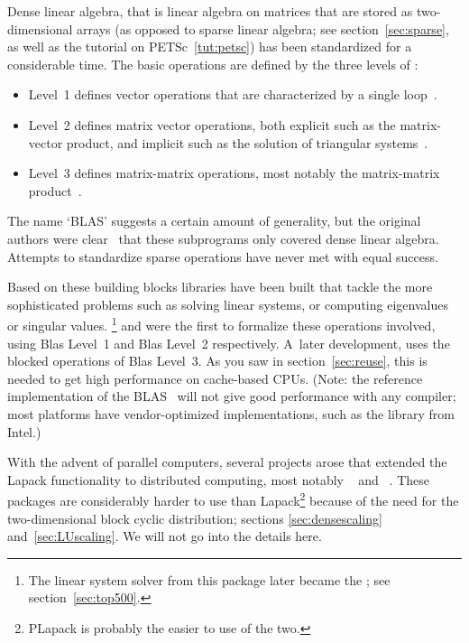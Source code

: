 Dense linear algebra, that is linear algebra on matrices that are
stored as two-dimensional arrays (as opposed to sparse linear algebra;
see section~\ref{sec:sparse}, as well as the
tutorial on PETSc~\ref{tut:petsc}) has been standardized for a
considerable time. The basic operations are defined by the three
levels of :
\begin{itemize}
\item Level~1 defines vector operations that are characterized by a
  single loop~\cite{Lawson:blas}.
\item Level~2 defines matrix vector operations, both explicit such as
  the matrix-vector product, and implicit such as the solution of
  triangular systems~\cite{BLAS2}.
\item Level~3 defines matrix-matrix operations, most notably the
  matrix-matrix product~\cite{BLAS3}.
\end{itemize}
The name `BLAS' suggests a certain amount of generality, but the
original authors were clear~\cite{Lawson:blas} that these subprograms
only covered dense linear algebra. Attempts to standardize sparse
operations have never met with equal success.

Based on these building blocks libraries have been built that tackle
the more sophisticated problems such as solving linear systems, or
computing eigenvalues or singular values.
\footnote{The linear system solver from this
  package later became the ; see
  section~\ref{sec:top500}.} and  were the first to formalize
these operations involved, using Blas Level~1 and Blas Level~2
respectively.  A~later development,  uses the
blocked operations of Blas Level~3. As you saw in
section~\ref{sec:reuse}, this is needed to get high performance on
cache-based CPUs. (Note: the reference implementation of the
BLAS~\cite{reference-blas} will not give good performance with any
compiler; most platforms have vendor-optimized implementations, such
as the  library from Intel.)

With the advent of parallel computers, several projects arose that
extended the Lapack functionality to distributed computing, most
notably ~\cite{scalapack} and
~\cite{PLAPACK,PLAPACK:UG}. These packages are
considerably harder to use than Lapack\footnote{PLapack is probably
  the easier to use of the two.} because of the need for the
two-dimensional block cyclic distribution; sections
\ref{sec:densescaling} and~\ref{sec:LUscaling}. We will not go into
the details here.

